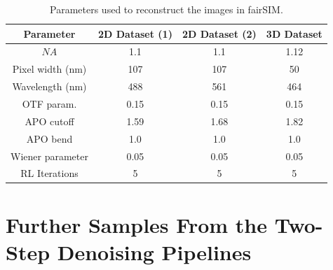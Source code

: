 \documentclass[12pt]{article}
\newcommand\NA{\mathit{NA}}
\begin{document}
\begin{table}[htp]
    \centering
    \begin{tabular}{| c | c | c | c |}
        \hline
        Parameter & 2D Dataset (1) & 2D Dataset (2) & 3D Dataset \\
        \hline
        $\NA$  & 1.1 & 1.1 & 1.12 \\
        \hline
        Pixel width (nm) & 107 & 107 & 50 \\
        \hline
        Wavelength (nm) & 488 & 561 & 464 \\
        \hline
        OTF param.  & 0.15 & 0.15 & 0.15 \\
        \hline
        APO cutoff & 1.59 & 1.68 & 1.82 \\
        \hline
        APO bend  & 1.0 & 1.0 & 1.0 \\
        \hline
        Wiener parameter & 0.05 & 0.05 & 0.05 \\
        \hline
        RL Iterations & 5 & 5 & 5\\
        \hline

    \end{tabular}
    \caption{Parameters used to reconstruct the images in fairSIM.}
    \label{tab:reconparams}
\end{table}

\section{Further Samples From the Two-Step Denoising Pipelines}
\end{document}
